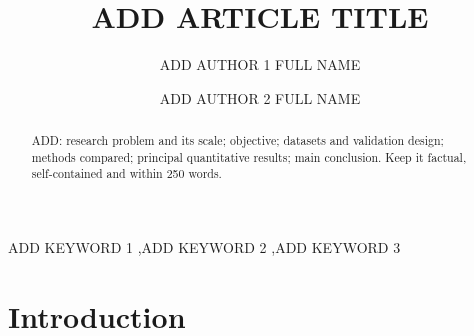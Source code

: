 \documentclass[final,5p,twocolumn]{elsarticle}
\begin{document}
\begin{frontmatter}


\title{ADD ARTICLE TITLE}

\author[aff1,aff3]{ADD AUTHOR 1 FULL NAME}

\author[aff2]{ADD AUTHOR 2 FULL NAME}


\address[aff1]{ADD DEPARTMENT, INSTITUTION, STREET ADDRESS, CITY, COUNTRY}
\address[aff2]{ADD DEPARTMENT, INSTITUTION, STREET ADDRESS, CITY, COUNTRY}
\address[aff3]{ADD SECOND AFFILIATION OF AUTHOR 1, CITY, COUNTRY}


\begin{abstract}
ADD: research problem and its scale; objective; datasets and validation design; methods compared; principal quantitative results; main conclusion. Keep it factual, self-contained and within 250 words.
\end{abstract}


\begin{keyword}
ADD KEYWORD 1 \sep ADD KEYWORD 2 \sep ADD KEYWORD 3
\end{keyword}

\end{frontmatter}


\section{Introduction}
\label{sec:introduction}
\end{document}
